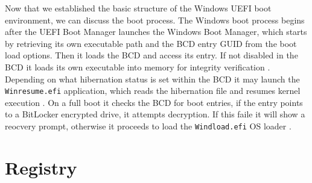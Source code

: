Now that we established the basic structure of the Windows UEFI boot environment, we can discuss the boot process.
The Windows boot process begins after the UEFI Boot Manager launches the Windows Boot Manager, which starts by retrieving its own executable path and the \ac{BCD} entry GUID from the boot load options.
Then it loads the \ac{BCD} and access its entry.
If not disabled in the \ac{BCD} it loads its own executable into memory for integrity verification \cite[12. The Windows Boot Manager]{windows-internals-7-part2}.
Depending on what hibernation status is set within the \ac{BCD} it may launch the \lstinline{Winresume.efi} application, which reads the hibernation file and resumes kernel execution \cite[12. Launching a boot application]{windows-internals-7-part2}.
On a full boot it checks the \ac{BCD} for boot entries, if the entry points to a BitLocker encrypted drive, it attempts decryption.
If this faile it will show a reocvery prompt, otherwise it proceeds to load the \lstinline{Windload.efi} \ac{OS} loader \cite[12. Launching a boot application]{windows-internals-7-part2}.

\cite[12. Launching a boot application]{windows-internals-7-part2}


\section{Registry}

